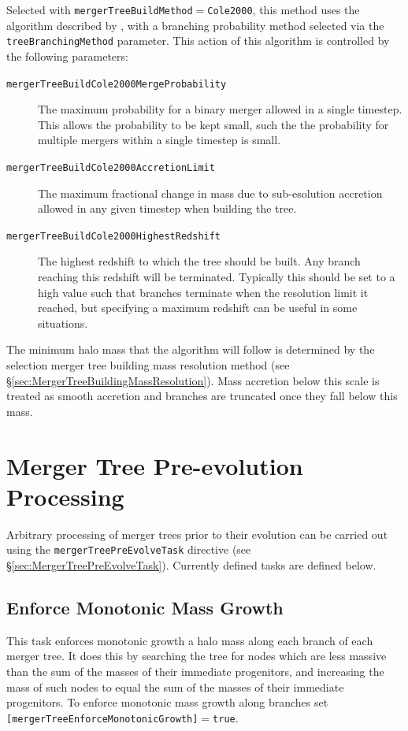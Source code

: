 Selected with {\tt mergerTreeBuildMethod}$=${\tt Cole2000}, this method uses the algorithm described by \cite{cole_hierarchical_2000}, with a branching probability method selected via the {\tt treeBranchingMethod} parameter. This action of this algorithm is controlled by the following parameters:
\begin{description}
 \item [{\tt mergerTreeBuildCole2000MergeProbability}] The maximum probability for a binary merger allowed in a single timestep. This allows the probability to be kept small, such the the probability for multiple mergers within a single timestep is small.
 \item [{\tt mergerTreeBuildCole2000AccretionLimit}] The maximum fractional change in mass due to sub-esolution accretion allowed in any given timestep when building the tree.
 \item [{\tt mergerTreeBuildCole2000HighestRedshift}] The highest redshift to which the tree should be built. Any branch reaching this redshift will be terminated. Typically this should be set to a high value such that branches terminate when the resolution limit it reached, but specifying a maximum redshift can be useful in some situations.
\end{description}
The minimum halo mass that the algorithm will follow is determined by the selection merger tree building mass resolution method (see \S\ref{sec:MergerTreeBuildingMassResolution}). Mass accretion below this scale is treated as smooth accretion and branches are truncated once they fall below this mass.

\section{Merger Tree Pre-evolution Processing}

Arbitrary processing of merger trees prior to their evolution can be carried out using the {\tt mergerTreePreEvolveTask} directive (see \S\ref{sec:MergerTreePreEvolveTask}). Currently defined tasks are defined below.

\subsection{Enforce Monotonic Mass Growth}

This task enforces monotonic growth a halo mass along each branch of each merger tree. It does this by searching the tree for nodes which are less massive than the sum of the masses of their immediate progenitors, and increasing the mass of such nodes to equal the sum of the masses of their immediate progenitors. To enforce monotonic mass growth along branches set {\tt [mergerTreeEnforceMonotonicGrowth]}$=${\tt true}.

